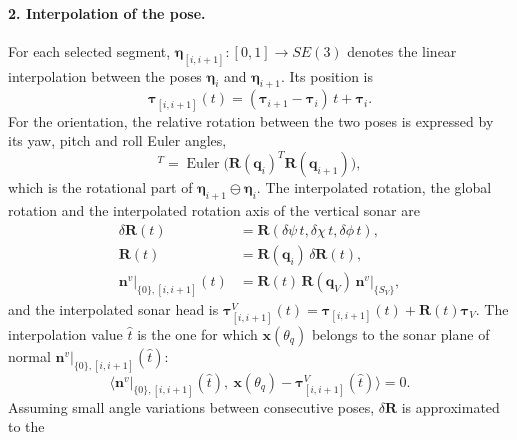 \paragraph{2. Interpolation of the pose.} For each selected segment, $\boldsymbol{\eta}_{[i,i+1]} :
[0, 1] \to SE(3)$ denotes the linear interpolation between the poses $\boldsymbol{\eta}_i$ and
$\boldsymbol{\eta}_{i+1}$. Its position is
\begin{equation}                         %
  \boldsymbol{\tau}_{[i,i+1]}(t) = (\boldsymbol{\tau}_{i+1} - \boldsymbol{\tau}_i)\, t + \boldsymbol{\tau}_i.
  \label{eq:msis_interp_pos}
\end{equation}
For the orientation, the relative rotation between the two poses is expressed by its yaw, pitch and
roll Euler angles,
\begin{equation}                         %
  [\delta\psi\ \ \delta\chi\ \ \delta\phi]^T = \operatorname{Euler}\big(\mathbf{R}(\mathbf{q}_i)^T \mathbf{R}(\mathbf{q}_{i+1})\big),
  \label{eq:msis_euler}
\end{equation}
which is the rotational part of $\boldsymbol{\eta}_{i+1} \ominus \boldsymbol{\eta}_i$. The interpolated
rotation, the global rotation and the interpolated rotation axis of the vertical sonar are
\begin{align}                            %
  \delta\mathbf{R}(t) &= \mathbf{R}(\delta\psi\, t, \delta\chi\, t, \delta\phi\, t),                 \label{eq:msis_deltaR}\\
  \mathbf{R}(t)       &= \mathbf{R}(\mathbf{q}_i)\, \delta\mathbf{R}(t),                              \label{eq:msis_Rt}\\
  \mathbf{n}^v|_{\{0\},[i,i+1]}(t) &= \mathbf{R}(t)\, \mathbf{R}(\mathbf{q}_V)\, \mathbf{n}^v|_{\{S_V\}}, \label{eq:msis_axis_t}
\end{align}
and the interpolated sonar head is
$\boldsymbol{\tau}^V_{[i,i+1]}(t) = \boldsymbol{\tau}_{[i,i+1]}(t) + \mathbf{R}(t)\boldsymbol{\tau}_V$.
The interpolation value $\hat{t}$ is the one for which $\mathbf{x}(\theta_q)$ belongs to the sonar
plane of normal $\mathbf{n}^v|_{\{0\},[i,i+1]}(\hat{t})$:
\begin{equation}                         %
  \big\langle \mathbf{n}^v|_{\{0\},[i,i+1]}(\hat{t}),\ \mathbf{x}(\theta_q) - \boldsymbol{\tau}^V_{[i,i+1]}(\hat{t}) \big\rangle = 0.
  \label{eq:msis_plane}
\end{equation}
Assuming small angle variations between consecutive poses, $\delta\mathbf{R}$ is approximated to the
